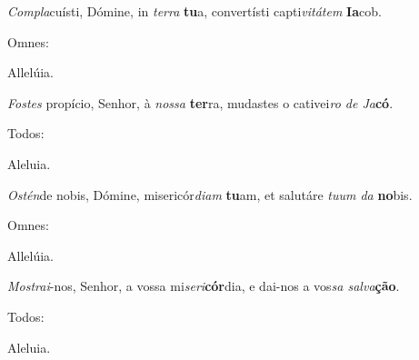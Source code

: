 \begin{greenumerate}


  \ifbook%
    \setcounter{enumi}{1}
  \else
    \item \textit{Compla}cuísti, Dómine, in \textit{terra} \textbf{tu}a, {\GreStar} convertísti capti\textit{vitátem} \textbf{Ia}\-cob. \begin{rubrica}Omnes:\end{rubrica} Allelúia.
  \fi

  \switchcolumn%

  \ifbook%
    \setcounter{enumi}{1}
  \else
    \item \textit{Fostes} propício, Senhor, à \textit{nossa} \textbf{ter}ra, {\GreStar} mudastes o cativei\textit{ro de Ja}\textbf{có}. \begin{rubrica}Todos:\end{rubrica} Aleluia.
  \fi

  \switchcolumn*


  \item \textit{Ostén}de nobis, Dómine, misericór\textit{diam} \textbf{tu}\-am, {\GreStar} et salutáre \textit{tuum da} \textbf{no}bis. \begin{rubrica}Omnes:\end{rubrica} Allelúia.

  \switchcolumn%

  \item \textit{Mostrai}-nos, Senhor, a vossa mi\textit{seri}\textbf{cór}dia, {\GreStar} e dai-nos a vos\textit{sa sal\-va}\textbf{ção}. \begin{rubrica}Todos:\end{rubrica} Aleluia.
\end{greenumerate}